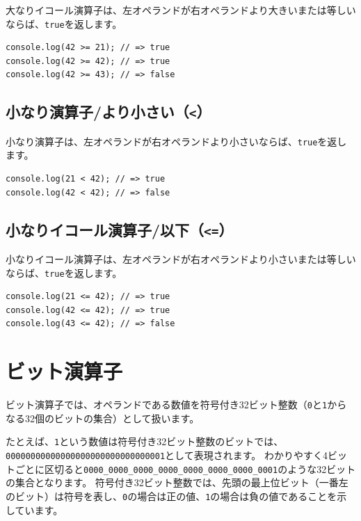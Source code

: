 大なりイコール演算子は、左オペランドが右オペランドより大きいまたは等しいならば、\texttt{true}を返します。

\begin{lstlisting}
console.log(42 >= 21); // => true
console.log(42 >= 42); // => true
console.log(42 >= 43); // => false
\end{lstlisting}

\hypertarget{less-than}{%
\subsection{\texorpdfstring{小なり演算子/より小さい（\texttt{\textless{}}）}{小なり演算子/より小さい（\textless{}）}}\label{less-than}}

小なり演算子は、左オペランドが右オペランドより小さいならば、\texttt{true}を返します。

\begin{lstlisting}
console.log(21 < 42); // => true
console.log(42 < 42); // => false
\end{lstlisting}

\hypertarget{less-than-equal}{%
\subsection{\texorpdfstring{小なりイコール演算子/以下（\texttt{\textless{}=}）}{小なりイコール演算子/以下（\textless{}=）}}\label{less-than-equal}}

小なりイコール演算子は、左オペランドが右オペランドより小さいまたは等しいならば、\texttt{true}を返します。

\begin{lstlisting}
console.log(21 <= 42); // => true
console.log(42 <= 42); // => true
console.log(43 <= 42); // => false
\end{lstlisting}

\hypertarget{bit-operator}{%
\section{ビット演算子}\label{bit-operator}}

ビット演算子では、オペランドである数値を符号付き32ビット整数（\texttt{0}と\texttt{1}からなる32個のビットの集合）として扱います。

たとえば、\texttt{1}という数値は符号付き32ビット整数のビットでは、\texttt{00000000000000000000000000000001}として表現されます。
わかりやすく4ビットごとに区切ると\texttt{0000\_0000\_0000\_0000\_0000\_0000\_0000\_0001}のような32ビットの集合となります。
符号付き32ビット整数では、先頭の最上位ビット（一番左のビット）は符号を表し、\texttt{0}の場合は正の値、\texttt{1}の場合は負の値であることを示しています。

